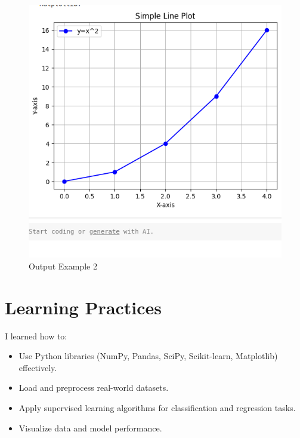 \documentclass[11pt]{article}
\begin{document}
\begin{figure}[h!]
    \centering
    \includegraphics[width=0.6\linewidth]{ml2.png}
    \caption{Output Example 2}
    \label{fig:output2}
\end{figure}
\section*{Learning Practices}
I learned how to:
\begin{itemize}
    \item Use Python libraries (NumPy, Pandas, SciPy, Scikit-learn, Matplotlib) effectively.
    \item Load and preprocess real-world datasets.
    \item Apply supervised learning algorithms for classification and regression tasks.
    \item Visualize data and model performance.
\end{itemize}
\end{document}

